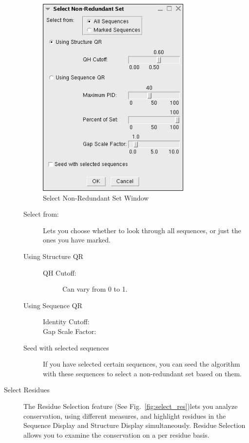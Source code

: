 \begin{description}
 \begin{figure}[here]
 \centerline{\includegraphics [width=3in]{./pictures/select_nrset.jpg}}
 \caption{Select Non-Redundant Set Window}
\label{fig:select_nr}
\end{figure}

\begin{description}
     \item[Select from:] Lets you choose whether to look through
     all sequences, or just the ones you have marked.
     \item[Using Structure QR]
          \begin{description}
               \item[QH Cutoff:]  Can vary from 0 to 1.
           \end{description}
    \item[Using Sequence QR]
             \begin{description}
               \item[Identity Cutoff:]
               \item[Gap Scale Factor:]
           \end{description}   
     \item[Seed with selected sequences]  If you have selected certain
     sequences, you can seed the algorithm with these sequences to
     select a non-redundant set based on them.
\end{description}

\item[Select Residues]
The \textsf{Residue Selection} feature (See
Fig.~\ref{fig:select_res})lets you analyze conservation, using different
measures, and highlight residues in the Sequence Display and Structure
Display simultaneously.  \textsf{Residue Selection} allows you to examine the
conservation on a per residue basis.
 

\end{description}
